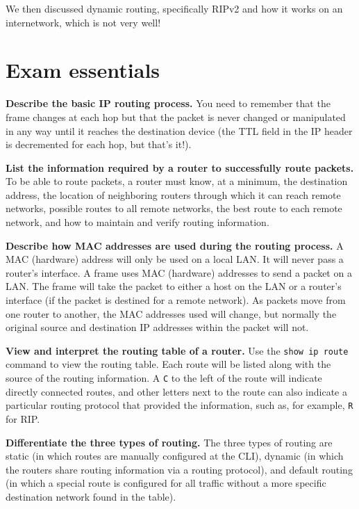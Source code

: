 We then discussed dynamic routing, specifically RIPv2 and how it works
on an internetwork, which is not very well!



\section{Exam essentials}

\textbf{Describe the basic IP routing process.} You need to remember
that the frame changes at each hop but that the packet is never changed
or manipulated in any way until it reaches the destination device (the
TTL field in the IP header is decremented for each hop, but that's it!).

\textbf{List the information required by a router to successfully route
packets.} To be able to route packets, a router must know, at a minimum,
the destination address, the location of neighboring routers through
which it can reach remote networks, possible routes to all remote
networks, the best route to each remote network, and how to maintain and
verify routing information.

\textbf{Describe how MAC addresses are used during the routing process.}
A MAC (hardware) address will only be used on a local LAN. It will never
pass a router's interface. A frame uses MAC (hardware) addresses to send
a packet on a LAN. The frame will take the packet to either a host on
the LAN or a router's interface (if the packet is destined for a remote
network). As packets move from one router to another, the MAC addresses
used will change, but normally the original source and destination IP
addresses within the packet will not.

\textbf{View and interpret the routing table of a router.} Use the
\texttt{show\ ip\ route} command to view the routing table. Each route
will be listed along with the source of the routing information. A
\texttt{C} to the left of the route will indicate directly connected
routes, and other letters next to the route can also indicate a
particular routing protocol that provided the information, such as, for
example, \texttt{R} for RIP.

\textbf{Differentiate the three types of routing.} The three types of
routing are static (in which routes are manually configured at the CLI),
dynamic (in which the routers share routing information via a routing
protocol), and default routing (in which a special route is configured
for all traffic without a more specific destination network found in the
table).

